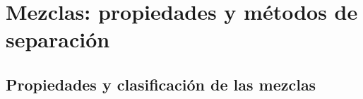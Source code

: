 \thispagestyle{plain}
\section{Mezclas: propiedades y métodos de separación}

\subsection{Propiedades y clasificación de las mezclas}

\newpage
